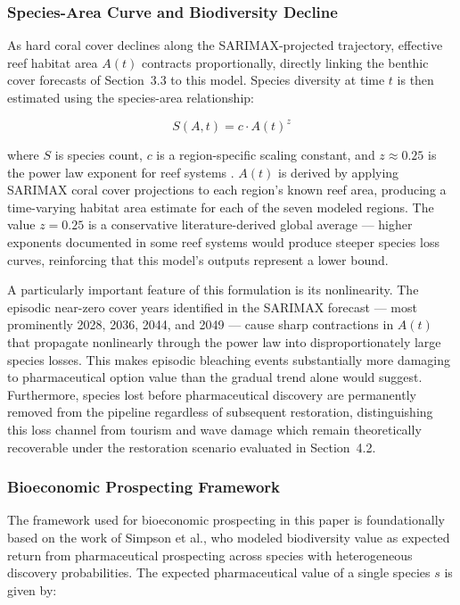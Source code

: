 \documentclass[10pt,letterpaper]{article}
\begin{document}
\subsubsection{Species-Area Curve and Biodiversity Decline}

As hard coral cover declines along the SARIMAX-projected trajectory, effective reef habitat area $A(t)$ contracts proportionally, directly linking the benthic cover forecasts of Section~3.3 to this model. Species diversity at time $t$ is then estimated using the species-area relationship:

\begin{equation}
S(A,t) = c \cdot A(t)^{z}
\end{equation}

\noindent where $S$ is species count, $c$ is a region-specific scaling constant, and $z \approx 0.25$ is the power law exponent for reef systems \cite{macarthur1967}. $A(t)$ is derived by applying SARIMAX coral cover projections to each region's known reef area, producing a time-varying habitat area estimate for each of the seven modeled regions. The value $z = 0.25$ is a conservative literature-derived global average --- higher exponents documented in some reef systems would produce steeper species loss curves, reinforcing that this model's outputs represent a lower bound.

A particularly important feature of this formulation is its nonlinearity. The episodic near-zero cover years identified in the SARIMAX forecast --- most prominently 2028, 2036, 2044, and 2049 --- cause sharp contractions in $A(t)$ that propagate nonlinearly through the power law into disproportionately large species losses. This makes episodic bleaching events substantially more damaging to pharmaceutical option value than the gradual trend alone would suggest. Furthermore, species lost before pharmaceutical discovery are permanently removed from the pipeline regardless of subsequent restoration, distinguishing this loss channel from tourism and wave damage which remain theoretically recoverable under the restoration scenario evaluated in Section~4.2.

\subsubsection{Bioeconomic Prospecting Framework}

The framework used for bioeconomic prospecting in this paper is foundationally based on the work of Simpson et al., who modeled biodiversity value as expected return from pharmaceutical prospecting across species with heterogeneous discovery probabilities. The expected pharmaceutical value of a single species $s$ is given by:
\end{document}
